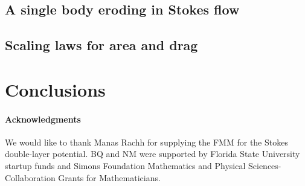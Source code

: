 \documentclass[preprint, 10pt]{elsarticle}
\begin{document}
\subsection{A single body eroding in Stokes flow}

\subsection{Scaling laws for area and drag}
\label{sec:scaling}


\section{Conclusions\label{s:conclusions}}


\paragraph{\bf Acknowledgments} We would like to thank Manas Rachh for
supplying the FMM for the Stokes double-layer potential. BQ and NM were
supported by Florida State University startup funds and Simons
Foundation Mathematics and Physical Sciences-Collaboration Grants for
Mathematicians.

 

\end{document}
